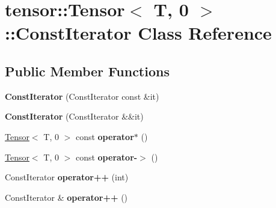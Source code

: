 \hypertarget{classtensor_1_1Tensor_3_01T_00_010_01_4_1_1ConstIterator}{}\section{tensor\+:\+:Tensor$<$ T, 0 $>$\+:\+:Const\+Iterator Class Reference}
\label{classtensor_1_1Tensor_3_01T_00_010_01_4_1_1ConstIterator}
\subsection*{Public Member Functions}
\begin{DoxyCompactItemize}
\item 
{\bfseries Const\+Iterator} (Const\+Iterator const \&it)\hypertarget{classtensor_1_1Tensor_3_01T_00_010_01_4_1_1ConstIterator_a8f9b928aca1521c3dc4ed535c01813d6}{}\label{classtensor_1_1Tensor_3_01T_00_010_01_4_1_1ConstIterator_a8f9b928aca1521c3dc4ed535c01813d6}

\item 
{\bfseries Const\+Iterator} (Const\+Iterator \&\&it)\hypertarget{classtensor_1_1Tensor_3_01T_00_010_01_4_1_1ConstIterator_a6016e51e6fda3e01d69f68d18afa5186}{}\label{classtensor_1_1Tensor_3_01T_00_010_01_4_1_1ConstIterator_a6016e51e6fda3e01d69f68d18afa5186}

\item 
\hyperlink{classtensor_1_1Tensor}{Tensor}$<$ T, 0 $>$ const {\bfseries operator$\ast$} ()\hypertarget{classtensor_1_1Tensor_3_01T_00_010_01_4_1_1ConstIterator_af8c8a359132678ee731ddadd9b867687}{}\label{classtensor_1_1Tensor_3_01T_00_010_01_4_1_1ConstIterator_af8c8a359132678ee731ddadd9b867687}

\item 
\hyperlink{classtensor_1_1Tensor}{Tensor}$<$ T, 0 $>$ const {\bfseries operator-\/$>$} ()\hypertarget{classtensor_1_1Tensor_3_01T_00_010_01_4_1_1ConstIterator_a58313744ef678cd786926ef0d99c265e}{}\label{classtensor_1_1Tensor_3_01T_00_010_01_4_1_1ConstIterator_a58313744ef678cd786926ef0d99c265e}

\item 
Const\+Iterator {\bfseries operator++} (int)\hypertarget{classtensor_1_1Tensor_3_01T_00_010_01_4_1_1ConstIterator_aefc40244d7e6c9c4a00cdc4e26f54e7e}{}\label{classtensor_1_1Tensor_3_01T_00_010_01_4_1_1ConstIterator_aefc40244d7e6c9c4a00cdc4e26f54e7e}

\item 
Const\+Iterator \& {\bfseries operator++} ()\hypertarget{classtensor_1_1Tensor_3_01T_00_010_01_4_1_1ConstIterator_abdcc03e0c54463887b0f423ca1a8cf14}{}\label{classtensor_1_1Tensor_3_01T_00_010_01_4_1_1ConstIterator_abdcc03e0c54463887b0f423ca1a8cf14}


\end{DoxyCompactItemize}
